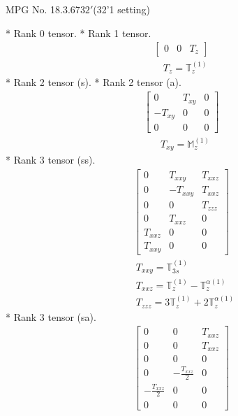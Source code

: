 \documentclass[fleqn,8pt,landscape]{jsarticle}
\begin{document}
\setcounter{MaxMatrixCols}{32}

\renewcommand{\tablename}{Table~}
\renewcommand{\figurename}{Figure~}
\begin{center}
\LARGE
MPG No. 18.3.67\quad$32'$\quad(32'1 setting)
\end{center}
* Rank 0 tensor.
* Rank 1 tensor.
\begin{align*}
\begin{bmatrix} 0 & 0 & T_{z} \end{bmatrix}
\end{align*}
\begin{align*}
& T_{z} = \mathbb{T}_{z}^{(1)}
\end{align*}
* Rank 2 tensor (s).
* Rank 2 tensor (a).
\begin{align*}
\begin{bmatrix} 0 & T_{xy} & 0 \\ - T_{xy} & 0 & 0 \\ 0 & 0 & 0 \end{bmatrix}
\end{align*}
\begin{align*}
& T_{xy} = \mathbb{M}_{z}^{(1)}
\end{align*}
* Rank 3 tensor (ss).
\begin{align*}
\begin{bmatrix} 0 & T_{xxy} & T_{xxz} \\ 0 & - T_{xxy} & T_{xxz} \\ 0 & 0 & T_{zzz} \\ 0 & T_{xxz} & 0 \\ T_{xxz} & 0 & 0 \\ T_{xxy} & 0 & 0 \end{bmatrix}
\end{align*}
\begin{align*}
& T_{xxy} = \mathbb{T}_{3s}^{(1)} \\
& T_{xxz} = \mathbb{T}_{z}^{(1)} - \mathbb{T}_{z}^{\alpha(1)} \\
& T_{zzz} = 3 \mathbb{T}_{z}^{(1)} + 2 \mathbb{T}_{z}^{\alpha(1)}
\end{align*}
* Rank 3 tensor (sa).
\begin{align*}
\begin{bmatrix} 0 & 0 & T_{xxz} \\ 0 & 0 & T_{xxz} \\ 0 & 0 & 0 \\ 0 & - \frac{T_{xxz}}{2} & 0 \\ - \frac{T_{xxz}}{2} & 0 & 0 \\ 0 & 0 & 0 \end{bmatrix}
\end{align*}
\end{document}
